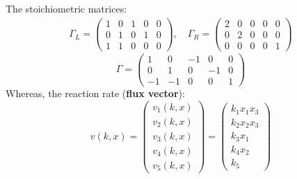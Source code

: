 \documentclass[aspectratio=169]{beamer}
\begin{document}
\begin{frame}
	The stoichiometric matrices:
	\begin{align*}
		\Gamma_L =
		\begin{pmatrix}
			1 & 0 & 1 & 0 & 0 \\
			0 & 1 & 0 & 1 & 0 \\
			1 & 1 & 0 & 0 & 0
		\end{pmatrix}
		, \quad
		\Gamma_R =
		\begin{pmatrix}
			2 & 0 & 0 & 0 & 0 \\
			0 & 2 & 0 & 0 & 0 \\
			0 & 0 & 0 & 0 & 1
		\end{pmatrix}
	\end{align*}
	\begin{equation*}
		\Gamma =
		\begin{pmatrix*}
			1 & 0 & -1 & 0 & 0 \\
			0 & 1 & 0 & -1 & 0 \\
			-1 & -1 & 0 & 0 & 1
		\end{pmatrix*}
	\end{equation*}
	Whereas, the reaction rate (\textbf{flux vector}):
	\[
		v(k,x) =
		\begin{pmatrix*}
			v_{1}(k,x)	 \\
			v_{2}(k,x)	 \\
			v_{3}(k,x)	 \\
			v_{4}(k,x)	 \\
			v_{5}(k,x)
		\end{pmatrix*} =
		\begin{pmatrix}
			k_1 x_1 x_3 \\
			k_2 x_2 x_3 \\
			k_3 x_1 \\
			k_4 x_2 \\
			k_5
		\end{pmatrix}
	\]
\end{frame}
\end{document}
